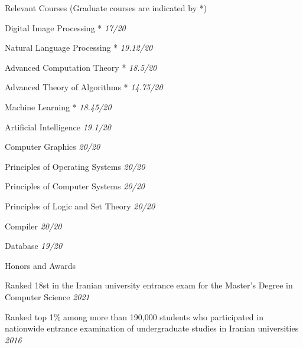 \documentclass[]{main}
\begin{document}
\begin{section}{Relevant Courses \small{(Graduate courses are indicated by *)}}
    \begin{multicols}{2}
        \begin{subsectionbullet}
            \item Digital Image Processing * \hfill \textit{17/20}
            \item Natural Language Processing * \hfill \textit{19.12/20}
            \item Advanced Computation Theory * \hfill \textit{18.5/20}
            \item Advanced Theory of Algorithms * \hfill \textit{14.75/20}
            \item Machine Learning * \hfill \textit{18.45/20}
            \item Artificial Intelligence \hfill \textit{19.1/20}
            \item Computer Graphics \hfill \textit{20/20}
            \item Principles of Operating Systems \hfill \textit{20/20}
            \item Principles of Computer Systems \hfill \textit{20/20}
            \item Principles of Logic and Set Theory \hfill \textit{20/20}
            \item Compiler \hfill \textit{20/20}
            \item Database \hfill \textit{19/20}
            \end{subsectionbullet}
    \end{multicols}
\end{section}


\begin{section}{Honors and Awards}
    \begin{subsectionbullet}
        \item Ranked 18st in the Iranian university entrance exam for the Master's Degree in Computer Science \hfill \textit{2021}
        \item Ranked top 1\% among more than 190,000 students who participated in nationwide entrance examination of undergraduate studies in Iranian universities \hfill \textit{2016}
        \end{subsectionbullet}
\end{section}
\end{document}
